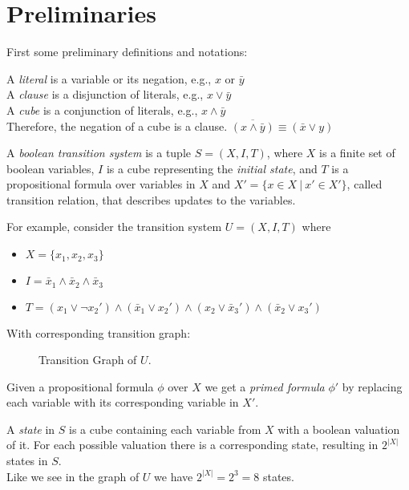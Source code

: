 \documentclass[11pt, a4paper, BCOR=10mm, ngerman]{scrbook}
\begin{document}
\section{Preliminaries} \vspace{-5mm}
First some preliminary definitions and notations:  \par
A \textsl{literal} is a variable or its negation, e.g., $x \text{ or } \bar y$ \\
A \textsl{clause} is a disjunction of literals, e.g., $x \lor \bar y$ \\
A \textsl{cube} is a conjunction of literals, e.g.,  $x \land \bar y$ \\
Therefore, the negation of a cube is a clause. $\overline{(x \land \bar y)} \equiv (\bar x \lor y)$  \par
A \textsl{boolean transition system} is a tuple $S = (X, I, T)$, where $X$ is a finite set of boolean variables, $I$ is a cube representing the \textsl{initial state}, and $T$ is a propositional formula over variables in $X$ and $X' = \{x \in X \ | \ x' \in X'\}$, called transition relation, that describes updates to the variables.
\par
For example, consider the transition system $U = (X, I, T)$ where
\begin{itemize}
\item $ X= \{x_1, x_2, x_3\}$
\item $I = \bar x_1 \land \bar x_2 \land \bar x_3$
\item $T = (x_1 \lor \neg x_2' ) \land ( \bar x_1 \lor x_2') \land (x_2 \lor \bar x_3') \land ( \bar x_2 \lor x_3')$
\end{itemize}
\pagebreak
With corresponding transition graph:

\begin{figure}[H]
\centering

\caption{Transition Graph of $U$.}
\label{ex1}
\end{figure}

Given a propositional formula $\phi$ over $X$ we get a \textsl{primed formula} $\phi'$ by replacing each variable with its corresponding variable in $X'$. \par

A \textsl{state} in $S$ is a cube containing each variable from $X$ with a boolean valuation of it. For each possible valuation there is a corresponding state, resulting in $2^{|X|}$ states in $S$. \\
Like we see in the graph of $U$ we have $2^{|X|} = 2^3 = 8$ states.
\end{document}
